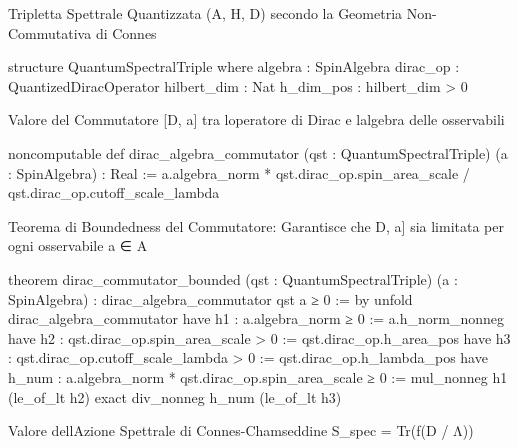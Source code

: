 \documentclass{article}
\newenvironment{Shaded}{%
  \begin{snugshade}%
}{%
  \end{snugshade}%
}%
\newenvironment{Highlighting}{%
}{%
}%
\newcommand{\NormalTok}[1]{#1}
\begin{document}
Tripletta Spettrale Quantizzata (A, H, D) secondo la Geometria
Non-Commutativa di Connes

\begin{Shaded}
\begin{Highlighting}[]
\NormalTok{structure QuantumSpectralTriple where}
\NormalTok{  algebra : SpinAlgebra}
\NormalTok{  dirac\_op : QuantizedDiracOperator}
\NormalTok{  hilbert\_dim : Nat}
\NormalTok{  h\_dim\_pos : hilbert\_dim \textgreater{} 0}

\end{Highlighting}
\end{Shaded}

Valore del Commutatore {[}D, a{]} tra l\textquotesingle operatore di
Dirac e l\textquotesingle algebra delle osservabili

\begin{Shaded}
\begin{Highlighting}[]
\NormalTok{noncomputable def dirac\_algebra\_commutator (qst : QuantumSpectralTriple) (a : SpinAlgebra) : Real :=}
\NormalTok{  a.algebra\_norm * qst.dirac\_op.spin\_area\_scale / qst.dirac\_op.cutoff\_scale\_lambda}

\end{Highlighting}
\end{Shaded}

Teorema di Boundedness del Commutatore: Garantisce che
\textbar\textbar{[}D, a{]}\textbar\textbar{} sia limitata per ogni
osservabile a ∈ A

\begin{Shaded}
\begin{Highlighting}[]
\NormalTok{theorem dirac\_commutator\_bounded (qst : QuantumSpectralTriple) (a : SpinAlgebra) :}
\NormalTok{  dirac\_algebra\_commutator qst a ≥ 0 := by}
\NormalTok{  unfold dirac\_algebra\_commutator}
\NormalTok{  have h1 : a.algebra\_norm ≥ 0 := a.h\_norm\_nonneg}
\NormalTok{  have h2 : qst.dirac\_op.spin\_area\_scale \textgreater{} 0 := qst.dirac\_op.h\_area\_pos}
\NormalTok{  have h3 : qst.dirac\_op.cutoff\_scale\_lambda \textgreater{} 0 := qst.dirac\_op.h\_lambda\_pos}
\NormalTok{  have h\_num : a.algebra\_norm * qst.dirac\_op.spin\_area\_scale ≥ 0 := mul\_nonneg h1 (le\_of\_lt h2)}
\NormalTok{  exact div\_nonneg h\_num (le\_of\_lt h3)}

\end{Highlighting}
\end{Shaded}

Valore dell\textquotesingle Azione Spettrale di Connes-Chamseddine
S\_spec = Tr(f(D / Λ))
\end{document}
